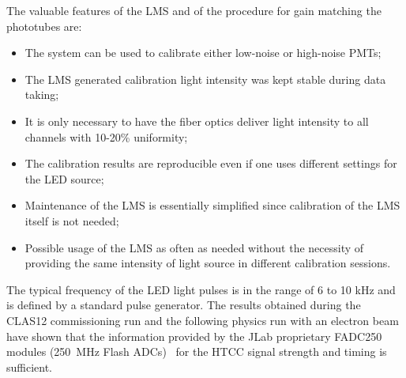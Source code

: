 The valuable features of the LMS and of the procedure for gain matching the phototubes are:
 
 \begin{itemize}
     \item The system can be used to calibrate either low-noise or high-noise PMTs;
     \item The LMS generated calibration light intensity was kept stable during data taking;
     \item It is only necessary to have the fiber optics deliver light intensity to all channels with 10-20\% uniformity;
     \item The calibration results are reproducible even if one uses different settings for the LED source;
     \item Maintenance of the LMS is essentially simplified since calibration of the LMS itself is not needed;
     \item Possible usage of the LMS as often as needed without the necessity of providing the same intensity of light
       source in different calibration sessions.
 \end{itemize}

The typical frequency of the LED light pulses is in the range of 6 to 10 kHz and is defined by a standard pulse
generator. The results obtained during the CLAS12 commissioning run and the following physics run with an
electron beam have shown that the information provided by the JLab proprietary FADC250 modules (250~MHz
Flash ADCs)~\cite{daq-nim} for the HTCC signal strength and timing is sufficient. 


